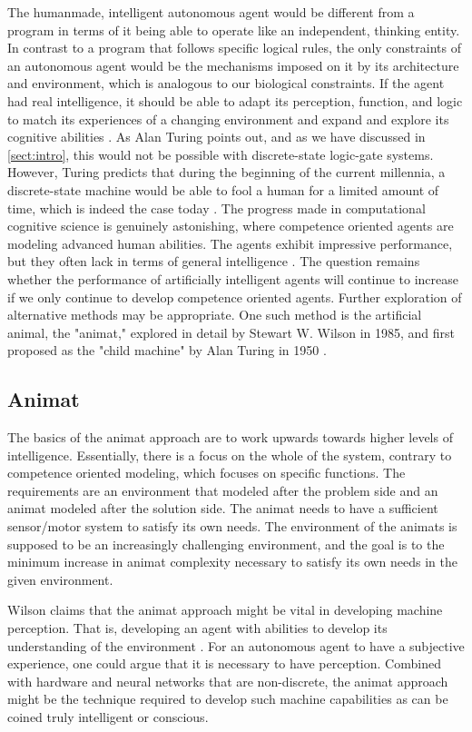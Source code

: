 The humanmade, intelligent autonomous agent would be different from a program in terms of it being able to operate like an independent, thinking entity.
In contrast to a program that follows specific logical rules,  the only constraints of an autonomous agent would be the mechanisms imposed on it by its architecture and environment, which is analogous to our biological constraints.
If the agent had real intelligence, it should be able to adapt its perception, function, and logic to match its experiences of a changing environment and expand and explore its cognitive abilities \cite{franklin_is_1997}.
As Alan Turing points out, and as we have discussed in \vref{sect:intro}, this would not be possible with discrete-state logic-gate systems.
However, Turing predicts that during the beginning of the current millennia, a discrete-state machine would be able to fool a human for a limited amount of time,
which is indeed the case today \cite{turing_computing_2009}.
The progress made in computational cognitive science is genuinely astonishing, where competence oriented agents are modeling advanced human abilities.
The agents exhibit impressive performance, but they often lack in terms of general intelligence \cite{wilson_animat_1991}.
The question remains whether the performance of artificially intelligent agents will continue to increase if we only continue to develop competence oriented agents. Further exploration of alternative methods may be appropriate.
One such method is the artificial animal, the "animat," explored in detail by Stewart W. Wilson in 1985, and first proposed as the "child machine" by Alan Turing in 1950 \cite{wilson_animat_1991} \cite{turing_computing_2009}.

\subsection{Animat}
The basics of the animat approach are to work upwards towards higher levels of intelligence.
Essentially, there is a focus on the whole of the system, contrary to competence oriented modeling, which focuses on specific functions.
The requirements are an environment that modeled after the problem side and an animat modeled after the solution side.   The animat needs to have a sufficient sensor/motor system to satisfy its own needs. The environment of the animats is supposed to be an increasingly challenging environment, and the goal is to the minimum increase in animat complexity necessary to satisfy its own needs in the given environment.

Wilson claims that the animat approach might be vital in developing machine perception.
That is, developing an agent with abilities to develop its understanding of the environment \cite{wilson_animat_1991}.
For an autonomous agent to have a subjective experience, one could argue that it is necessary to have perception.
Combined with hardware and neural networks that are non-discrete, the animat approach might be the technique required to develop such machine capabilities as can be coined truly intelligent or conscious.




